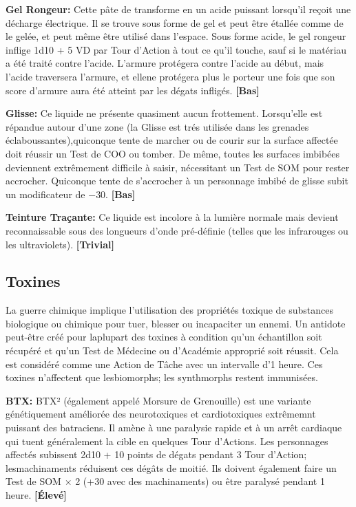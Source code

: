 \textbf{Gel Rongeur:} Cette pâte de transforme en un acide puissant lorsqu'il reçoit une décharge électrique. Il se trouve sous forme de gel et peut être étallée comme de le gelée, et peut même être utilisé dans l'espace. Sous forme acide, le gel rongeur inflige 1d10 + 5 VD par Tour d'Action à tout ce qu'il touche, sauf si le matériau a été traité contre l'acide. L'armure protégera contre l'acide au début, mais l'acide traversera l'armure, et ellene protégera plus le porteur une fois que son score d'armure aura été atteint par les dégats infligés. \textbf{[Bas]} 

\textbf{Glisse:} Ce liquide ne présente quasiment aucun frottement. Lorsqu'elle est répandue autour d'une zone (la Glisse est trés utilisée dans les grenades éclaboussantes),quiconque tente de marcher ou de courir sur la surface affectée doit réussir un Test de COO ou tomber. De même, toutes les surfaces imbibées deviennent extrêmement difficile à saisir, nécessitant un Test de SOM pour rester accrocher. Quiconque tente de s'accrocher à un personnage imbibé de glisse subit un modificateur de $-$30. \textbf{[Bas]} 

\textbf{Teinture Traçante:} Ce liquide est incolore à la lumière normale mais devient reconnaissable sous des longueurs d'onde pré-définie (telles que les infrarouges ou les ultraviolets). \textbf{[Trivial]} 



\subsection{Toxines} \label{sec:toxins} 

La guerre chimique implique l'utilisation des propriétés toxique de substances biologique ou chimique pour tuer, blesser ou incapaciter un ennemi. Un antidote peut-être créé pour laplupart des toxines à condition qu'un échantillon soit récupéré et qu'un Test de Médecine ou d'Académie approprié soit réussit. Cela est considéré comme une Action de Tâche avec un intervalle d'1 heure. Ces toxines n'affectent que lesbiomorphs; les synthmorphs restent immunisées. 

\textbf{BTX:} BTX² (également appelé Morsure de Grenouille) est une variante génétiquement améliorée des neurotoxiques et cardiotoxiques extrêmemnt puissant des batraciens. Il amène à une paralysie rapide et à un arrêt cardiaque qui tuent généralement la cible en quelques Tour d'Actions. Les personnages affectés subissent 2d10 + 10 points de dégats pendant 3 Tour d'Action; lesmachinaments réduisent ces dégâts de moitié. Ils doivent également faire un Test de SOM $\times$ 2 (+30 avec des machinaments) ou être paralysé pendant 1 heure. \textbf{[Élevé]} 

